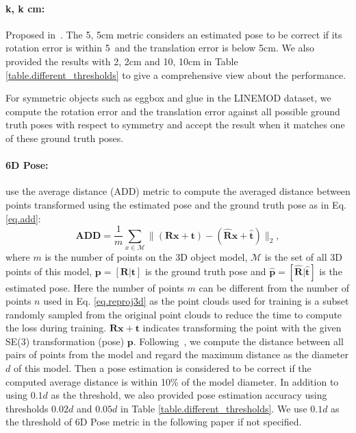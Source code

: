\documentclass[twocolumn]{svjour3}
\newcommand{\pose}[0]{\mathbf{p}}
\newcommand{\gtpose}[0]{\mathbf{\hat{p}}}
\newcommand{\yi}[1]{#1}
\begin{document}
\paragraph{k\degree, k cm:} Proposed in~\cite{Shotton2013cvpr}. The 5\degree, 5cm metric considers an estimated pose to be correct if its rotation error is within 5\degree \ and the translation error is below 5cm. We also provided the results with 2\degree, 2cm and 10\degree, 10cm in Table \ref{table.different_thresholds} to give a comprehensive view about the performance.

For symmetric objects such as eggbox and glue in the LINEMOD dataset, we compute the rotation error and the translation error against all possible ground truth poses with respect to symmetry and accept the result when it matches one of these ground truth poses.

\paragraph{6D Pose:} \cite{hinterstoisser2012accv} use the average distance (ADD) metric to compute the averaged distance between points transformed using the estimated pose and the ground truth pose as in Eq. \ref{eq.add}:
\begin{equation}
\label{eq.add}
\textbf{ADD}=\frac{1}{m}\sum_{x\in \mathcal{M}}\|(\mathbf{R}\mathbf{x}+\mathbf{t}) - (\mathbf{\hat{R}}\mathbf{x}+\mathbf{\hat{t}})\|_2,
\end{equation}
where $m$ is the number of points on the 3D object model, $\mathcal{M}$ is the set of all 3D points of this model, $\pose=[\mathbf{R}|\mathbf{t}]$ is the ground truth pose and $\gtpose=[\mathbf{\hat{R}}|\mathbf{\hat{t}}]$ is the estimated pose. \yi{Here the number of points $m$ can be different from the number of points $n$ used in Eq. \ref{eq.reproj3d} as the point clouds used for training is a subset randomly sampled from the original point clouds to reduce the time to compute the loss during training.} $\mathbf{R}\mathbf{x}+\mathbf{t}$ indicates transforming the point with the given SE(3) transformation (pose) $\pose$. Following~\citep{brachmann2016uncertainty}, we compute the distance between all pairs of points from the model and regard the maximum distance as the diameter $d$ of this model. Then a pose estimation is considered to be correct if the computed average distance is within 10\% of the model diameter. In addition to using $0.1 d$ as the threshold, we also provided pose estimation accuracy using thresholds $0.02 d$ and $0.05 d$ in Table \ref{table.different_thresholds}. We use $0.1 d$ as the threshold of 6D Pose metric in the following paper if not specified.
\end{document}
